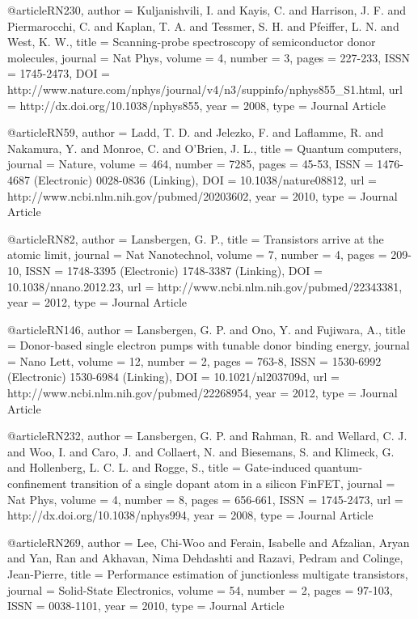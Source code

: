 @article{RN230,
   author = {Kuljanishvili, I. and Kayis, C. and Harrison, J. F. and Piermarocchi, C. and Kaplan, T. A. and Tessmer, S. H. and Pfeiffer, L. N. and West, K. W.},
   title = {Scanning-probe spectroscopy of semiconductor donor molecules},
   journal = {Nat Phys},
   volume = {4},
   number = {3},
   pages = {227-233},
   ISSN = {1745-2473},
   DOI = {http://www.nature.com/nphys/journal/v4/n3/suppinfo/nphys855_S1.html},
   url = {http://dx.doi.org/10.1038/nphys855},
   year = {2008},
   type = {Journal Article}
}

@article{RN59,
   author = {Ladd, T. D. and Jelezko, F. and Laflamme, R. and Nakamura, Y. and Monroe, C. and O'Brien, J. L.},
   title = {Quantum computers},
   journal = {Nature},
   volume = {464},
   number = {7285},
   pages = {45-53},
   ISSN = {1476-4687 (Electronic)
0028-0836 (Linking)},
   DOI = {10.1038/nature08812},
   url = {http://www.ncbi.nlm.nih.gov/pubmed/20203602},
   year = {2010},
   type = {Journal Article}
}

@article{RN82,
   author = {Lansbergen, G. P.},
   title = {Transistors arrive at the atomic limit},
   journal = {Nat Nanotechnol},
   volume = {7},
   number = {4},
   pages = {209-10},
   ISSN = {1748-3395 (Electronic)
1748-3387 (Linking)},
   DOI = {10.1038/nnano.2012.23},
   url = {http://www.ncbi.nlm.nih.gov/pubmed/22343381},
   year = {2012},
   type = {Journal Article}
}

@article{RN146,
   author = {Lansbergen, G. P. and Ono, Y. and Fujiwara, A.},
   title = {Donor-based single electron pumps with tunable donor binding energy},
   journal = {Nano Lett},
   volume = {12},
   number = {2},
   pages = {763-8},
   ISSN = {1530-6992 (Electronic)
1530-6984 (Linking)},
   DOI = {10.1021/nl203709d},
   url = {http://www.ncbi.nlm.nih.gov/pubmed/22268954},
   year = {2012},
   type = {Journal Article}
}

@article{RN232,
   author = {Lansbergen, G. P. and Rahman, R. and Wellard, C. J. and Woo, I. and Caro, J. and Collaert, N. and Biesemans, S. and Klimeck, G. and Hollenberg, L. C. L. and Rogge, S.},
   title = {Gate-induced quantum-confinement transition of a single dopant atom in a silicon FinFET},
   journal = {Nat Phys},
   volume = {4},
   number = {8},
   pages = {656-661},
   ISSN = {1745-2473},
   url = {http://dx.doi.org/10.1038/nphys994},
   year = {2008},
   type = {Journal Article}
}

@article{RN269,
   author = {Lee, Chi-Woo and Ferain, Isabelle and Afzalian, Aryan and Yan, Ran and Akhavan, Nima Dehdashti and Razavi, Pedram and Colinge, Jean-Pierre},
   title = {Performance estimation of junctionless multigate transistors},
   journal = {Solid-State Electronics},
   volume = {54},
   number = {2},
   pages = {97-103},
   ISSN = {0038-1101},
   year = {2010},
   type = {Journal Article}
}

